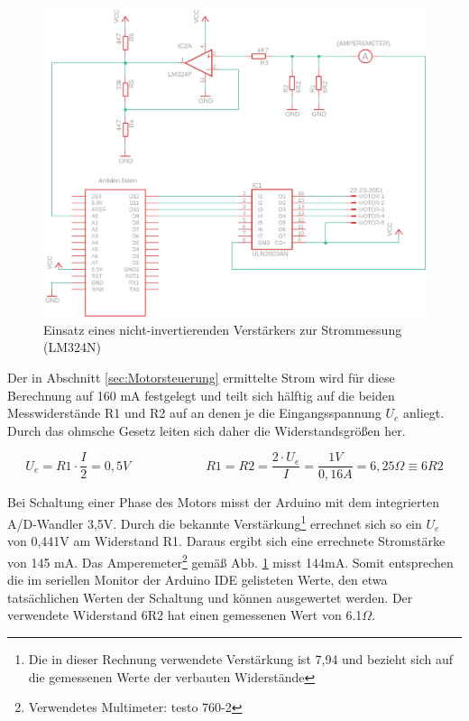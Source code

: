 \documentclass[11pt, titlepage]{report}
\begin{document}
				\begin{figure}[htbp]
					\centering
					\includegraphics[width=\linewidth]{./img/op2.png}
					\caption{Einsatz eines nicht-invertierenden Verstärkers zur Strommessung (LM324N)
					\label{fig:imgOP}}			
				\end{figure}
				\newpage

				Der in Abschnitt \ref{sec:Motorsteuerung} ermittelte Strom wird für diese Berechnung auf 160 mA festgelegt und teilt sich hälftig auf die beiden Messwiderstände R1 und R2 auf an denen je die Eingangsspannung $U_{e}$ anliegt. Durch das ohmsche Gesetz leiten sich daher die Widerstandsgrößen her.

				\begin{equation}
					U_{e}=R1\cdot\frac{I}{2}=0,5V \hspace{6em} R1=R2=\frac{2\cdot U_{e}}{I}=\frac{1V}{0,16A}=6,25\Omega \equiv 6R2
				\end{equation}

				Bei Schaltung einer Phase des Motors misst der Arduino mit dem integrierten A/D-Wandler 3,5V. Durch die bekannte Verstärkung\footnote{Die in dieser Rechnung verwendete Verstärkung ist 7,94 und bezieht sich auf die gemessenen Werte der verbauten Widerstände} errechnet sich so ein $U_{e}$ von 0,441V am Widerstand R1. Daraus ergibt sich eine errechnete Stromstärke von 145 mA. Das Amperemeter\footnote{Verwendetes Multimeter: testo 760-2} gemäß Abb. \ref{fig:imgOP} misst 144mA. Somit entsprechen die im seriellen Monitor der Arduino IDE gelisteten Werte, den etwa tatsächlichen Werten der Schaltung und können ausgewertet werden. Der verwendete Widerstand 6R2 hat einen gemessenen Wert von 6.1$\Omega$.
\end{document}
